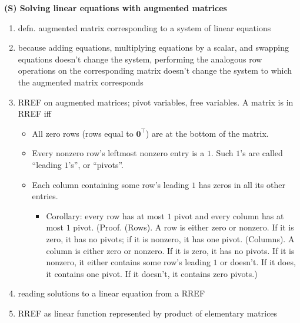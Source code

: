 \textbf{(S) Solving linear equations with augmented matrices}
\begin{enumerate}
    \item defn. augmented matrix corresponding to a system of linear equations
    \item because adding equations, multiplying equations by a scalar, and swapping equations doesn't change the system, performing the analogous row operations on the corresponding matrix doesn't change the system to which the augmented matrix corresponds
    \item RREF on augmented matrices; pivot variables, free variables. A matrix is in RREF iff
    \begin{itemize}
        \item All zero rows (rows equal to $\mathbf{0}^\top$) are at the bottom of the matrix.
        \item Every nonzero row's leftmost nonzero entry is a $1$. Such $1$'s are called ``leading $1$'s'', or ``pivots''.
        \item Each column containing some row's leading $1$ has zeros in all its other entries.
        \begin{itemize}
            \item Corollary: every row has at most $1$ pivot and every column has at most $1$ pivot. (Proof. (Rows). A row is either zero or nonzero. If it is zero, it has no pivots; if it is nonzero, it has one pivot. (Columns). A column is either zero or nonzero. If it is zero, it has no pivots. If it is nonzero, it either contains some row's leading $1$ or doesn't. If it does, it contains one pivot. If it doesn't, it contains zero pivots.)
        \end{itemize}
    \end{itemize}
    \item reading solutions to a linear equation from a RREF
    \item RREF as linear function represented by product of elementary matrices
\end{enumerate}

